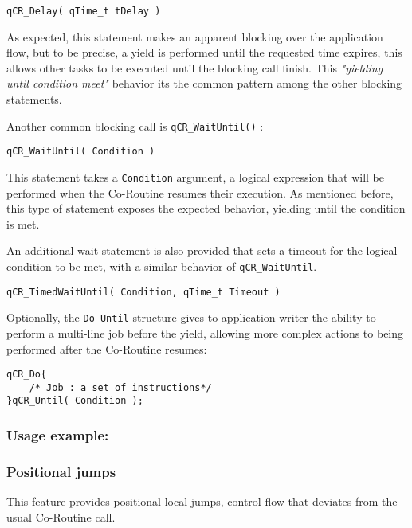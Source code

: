 \begin{lstlisting}[style=CStyle]
qCR_Delay( qTime_t tDelay ) 
\end{lstlisting}

As expected, this statement makes an apparent blocking over the application flow, but to be precise, a yield is performed until the requested time expires, this allows other tasks to be executed until the blocking call finish. This \textit{"yielding until condition meet"} behavior its the common pattern among the other blocking statements.
\medskip

Another common blocking call is \lstinline{qCR_WaitUntil()} :

\begin{lstlisting}[style=CStyle]
qCR_WaitUntil( Condition ) 
\end{lstlisting}

This statement takes a \lstinline{Condition} argument, a logical expression that will be performed when the Co-Routine resumes their execution. As mentioned before, this type of statement exposes the expected behavior, yielding until the condition is met.
\medskip

An additional wait statement is also provided that sets a timeout for the logical condition to be met, with a similar behavior of \lstinline{qCR_WaitUntil}. 
\medskip

\begin{lstlisting}[style=CStyle]
qCR_TimedWaitUntil( Condition, qTime_t Timeout )
\end{lstlisting}

Optionally, the \lstinline{Do-Until}   structure gives to application writer the ability to perform a multi-line job before the yield, allowing more complex actions to being performed after the Co-Routine resumes: 
\medskip

\begin{lstlisting}[style=CStyle]
qCR_Do{
    /* Job : a set of instructions*/
}qCR_Until( Condition );
\end{lstlisting}

\subsubsection*{Usage example:}


\subsubsection{Positional jumps}
This feature provides positional local jumps, control flow that deviates from the usual Co-Routine call. 

